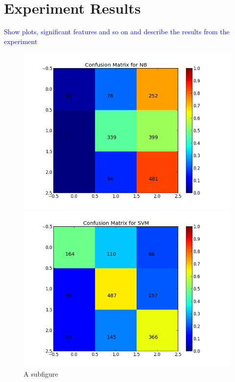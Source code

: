 \section{Experiment Results}
\textcolor{blue}{Show plots, significant features and so on and describe the results from the experiment}


\begin{figure}
\centering
\begin{minipage}{.5\textwidth}
  \centering
  \includegraphics[width=\linewidth]{../img/plots/grid/confusion_matrix_NB.png}
  \caption{A subfigure}
  \label{fig:sub1}
\end{minipage}%
\begin{minipage}{.5\textwidth}
  \centering
  \includegraphics[width=\linewidth]{../img/plots/grid/confusion_matrix_SVM.png}

\end{minipage}
\end{figure}
